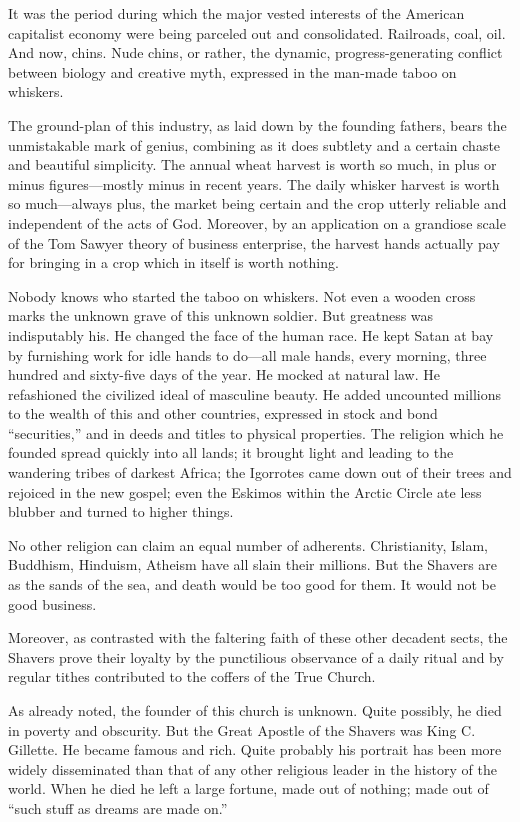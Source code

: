 \documentclass[openany,nobib]{tufte-book}
\begin{document}
It was the period during which the major vested interests of the
American capitalist economy were being parceled out and consolidated.
Railroads, coal, oil. And now, chins. Nude chins, or rather, the
dynamic, progress-generating conflict between biology and creative myth,
expressed in the man-made taboo on whiskers.

The ground-plan of this industry, as laid down by the founding fathers,
bears the unmistakable mark of genius, combining as it does subtlety and
a certain chaste and beautiful simplicity. The annual wheat harvest is
worth so much, in plus or minus figures---mostly minus in recent years.
The daily whisker harvest is worth so much---always plus, the market
being certain and the crop utterly reliable and independent of the acts
of God. Moreover, by an application on a grandiose scale of the Tom
Sawyer theory of business enterprise, the harvest hands actually pay for
bringing in a crop which in itself is worth nothing.

Nobody knows who started the taboo on whiskers. Not even a wooden cross
marks the unknown grave of this unknown soldier. But greatness was
indisputably his. He changed the face of the human race. He kept Satan
at bay by furnishing work for idle hands to do---all male hands, every
morning, three hundred and sixty-five days of the year. He mocked at
natural law. He refashioned the civilized ideal of masculine beauty. He
added uncounted millions to the wealth of this and other countries,
expressed in stock and bond ``securities,'' and in deeds and titles to
physical properties. The religion which he founded spread quickly into
all lands; it brought light and leading to the wandering tribes of
darkest Africa; the Igorrotes came down out of their trees and rejoiced
in the new gospel; even the Eskimos within the Arctic Circle ate less
blubber and turned to higher things.

No other religion can claim an equal number of adherents. Christianity,
Islam, Buddhism, Hinduism, Atheism have all slain their millions. But
the Shavers are as the sands of the sea, and death would be too good for
them. It would not be good business.

Moreover, as contrasted with the faltering faith of these other decadent
sects, the Shavers prove their loyalty by the punctilious observance of
a daily ritual and by regular tithes contributed to the coffers of the
True Church.

As already noted, the founder of this church is unknown. Quite possibly,
he died in poverty and obscurity. But the Great Apostle of the Shavers
was King C. Gillette. He became famous and rich. Quite probably his
portrait has been more widely disseminated than that of any other
religious leader in the history of the world. When he died he left a
large fortune, made out of nothing; made out of ``such stuff as dreams
are made on.''
\end{document}
